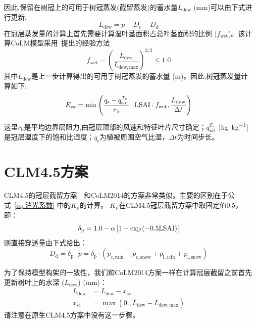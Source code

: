 因此,保留在树冠上的可用于树冠蒸发(截留蒸发)的蓄水量$L_{\mathrm{dew}}$ (mm)可以由下式进行更新:
\begin{equation}
  L_{\mathrm{dew}}={p}-D_{\mathrm{c}}-D_{\mathrm{d}}
\end{equation}
在冠层蒸发量的计算上首先需要计算湿叶茎面积占总叶茎面积的比例 ($f_{\mathrm{wet}}$)。该计算CoLM模型采用~\citet{dickinson1993biosphere}提出的经验方法
\begin{equation}
  f_{\mathrm{wet}}=\left(\frac{L_{\mathrm{dew}}}{L_{\mathrm{dew,max}}}\right)^{2 / 3} \leqslant 1.0
\end{equation}
其中$L_{\mathrm{dew}}$是上一步计算得出的可用于树冠蒸发的蓄水量 (m)。因此,树冠蒸发量计算如下:
\begin{equation}
  E_{\mathrm{va}} =\min \left(\frac{q_{\mathrm{s}}-q_{\mathrm{sat}}^{T_{\mathrm{v}}}}{r_{\mathrm{b}}}\cdot{\rm LSAI}\cdot f_{\mathrm{wet}}, \frac{L_{\mathrm{dew}}}{\Delta t}\right)
\end{equation}
这里$r_{\mathrm {b}} $是平均边界层阻力,由冠层顶部的风速和特征叶片尺寸确定；$q_{\mathrm{sat}}^{T_{\mathrm {v}} }$ (\unit{kg.kg^{-1}})是冠层温度下的饱和比湿度；$q_{\mathrm {s}} $为植被周围空气比湿，$\Delta t$为时间步长。


\section{CLM4.5方案}
CLM4.5的冠层截留方案~\citep{oleson2013technical}~和CoLM2014的方案非常类似。主要的区别在于公式~\eqref{eq:消光系数} 中的$K_{\mathrm {p}} $的计算。
$K_{\mathrm {p}} $在CLM4.5冠层截留方案中取固定值0.5，即：
%
\begin{equation}
  \delta_{\mathrm{p}}=1.0-\alpha \left[1-\exp \left(-0.5  {\rm LSAI}\right)\right]
\end{equation}
则直接穿透量由下式给出：
\begin{equation}
  D_{\mathrm{d}}=\delta_{\mathrm{p}} \cdot p=\delta_{\mathrm{p}} \cdot\left(p_{\mathrm{c,rain}}+p_{\mathrm{c,snow}}+p_{\mathrm{l,rain}}+p_{\mathrm{l,snow}}\right)
\end{equation}

为了保持模型构架的一致性，我们和CoLM2014方案一样在计算冠层截留之前首先更新树叶上的水深 ($L_{\mathrm{dew}}$) (mm)：
\begin{equation}
  \begin{aligned}
    L_{\mathrm{dew}} &= L_{\mathrm{dew}}-x_{\mathrm{sc}} \\
    x_{\mathrm{s c}} &= \max \left(0., L_{\mathrm{dew}}-L_{\mathrm{dew,max}}\right)
  \end{aligned}
\end{equation}
请注意在原生CLM4.5方案中没有这一步骤。

